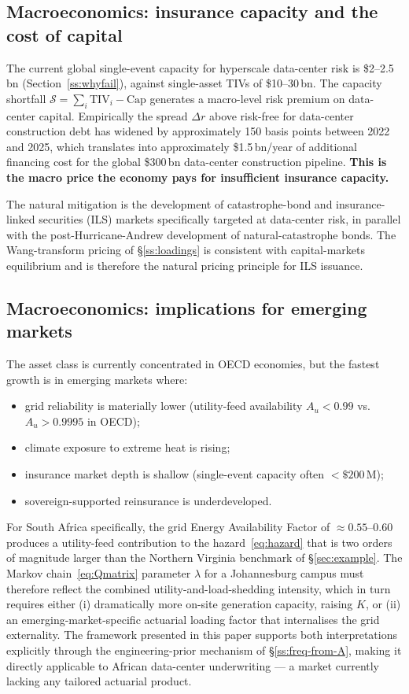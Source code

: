 \subsection{Macroeconomics: insurance capacity and the cost of capital}\label{ss:capacity}

The current global single-event capacity for hyperscale data-center
risk is \$2--2.5\,bn (Section~\ref{ss:whyfail}), against
single-asset TIVs of \$10--30\,bn. The capacity shortfall
$\mathcal{S}=\sum_i\text{TIV}_i-\text{Cap}$ generates a macro-level
risk premium on data-center capital. Empirically the spread
$\Delta r$ above risk-free for data-center construction debt has
widened by approximately 150 basis points between 2022 and 2025,
which translates into approximately \$1.5\,bn/year of additional
financing cost for the global \$300\,bn data-center construction
pipeline. \textbf{This is the macro price the economy pays for
insufficient insurance capacity.}

The natural mitigation is the development of catastrophe-bond and
insurance-linked securities (ILS) markets specifically targeted at
data-center risk, in parallel with the post-Hurricane-Andrew
development of natural-catastrophe bonds. The Wang-transform pricing
of \S\ref{ss:loadings} is consistent with capital-markets equilibrium
and is therefore the natural pricing principle for ILS issuance.

\subsection{Macroeconomics: implications for emerging markets}\label{ss:em}

The asset class is currently concentrated in OECD economies, but the
fastest growth is in emerging markets where:
\begin{itemize}[leftmargin=*,nosep]
   \item grid reliability is materially lower (utility-feed
         availability $A_u<0.99$ vs.\ $A_u>0.9995$ in OECD);
   \item climate exposure to extreme heat is rising;
   \item insurance market depth is shallow (single-event capacity
         often $<\$200\,$M);
   \item sovereign-supported reinsurance is underdeveloped.
\end{itemize}
For South Africa specifically, the grid Energy Availability Factor
of $\approx 0.55$--$0.60$ produces a utility-feed contribution to the
hazard~\eqref{eq:hazard} that is two orders of magnitude larger than
the Northern Virginia benchmark of \S\ref{sec:example}. The Markov
chain~\eqref{eq:Qmatrix} parameter $\lambda$ for a Johannesburg
campus must therefore reflect the combined utility-and-load-shedding
intensity, which in turn requires either (i) dramatically more
on-site generation capacity, raising $K$, or (ii) an
emerging-market-specific actuarial loading factor that internalises
the grid externality. The framework presented in this paper supports
both interpretations explicitly through the engineering-prior
mechanism of \S\ref{ss:freq-from-A}, making it directly applicable
to African data-center underwriting --- a market currently lacking
any tailored actuarial product.

